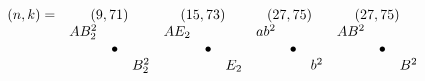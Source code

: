 \documentclass{article}
\begin{document}
\(
\begin{array}{crclrclrclrclrclrclrclrcl}
  (n,k)= & \multicolumn{3}{c}{(9,71)} & \multicolumn{3}{c}{(15,73)} & \multicolumn{3}{c}{(27,75)} & \multicolumn{3}{c}{(27,75)}  \\
  & AB_2^2 & & & AE_2 & & & ab^2 & & & AB^2 \\
  & & \bullet & & & \bullet & & & \bullet & & & \bullet \\
  & & & B_2^2 & & & E_2 & & & b^2 &&& B^2
\end{array}
\)\\
\end{document}
